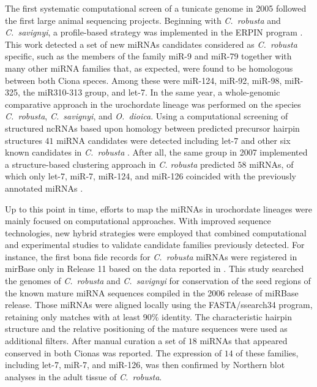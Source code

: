 \documentclass[graybox]{svmult}
\begin{document}
The first systematic computational screen of a tunicate genome in 2005
followed the first large animal sequencing projects. Beginning with
\textit{C.\ robusta} and \textit{C.\ savignyi}, a profile-based strategy
was implemented in the ERPIN program \cite{Legendre2005}. This work
detected a set of new miRNAs candidates considered as \textit{C.\ robusta}
specific, such as the members of the family miR-9 and miR-79 together with
many other miRNA families that, as expected, were found to be homologous between
both Ciona speces. Among these were miR-124, miR-92, miR-98, miR-325, 
the miR310-313 group, and let-7. In the same year, a whole-genomic comparative
approach in the urochordate lineage was performed on the species
\textit{C.\ robusta}, \textit{C.\ savignyi}, and \textit{O.\ dioica}. Using a
computational screening of structured ncRNAs based upon homology between
predicted precursor hairpin structures $41$ miRNA candidates were detected
including let-7 and other six known candidates in \textit{C.\ robusta}
\cite{Missal2005}. After all, the same group in 2007 implemented a
structure-based clustering approach in \textit{C. robusta} predicted $58$
miRNAs, of which only let-7, miR-7, miR-124, and miR-126 coincided with the
previously annotated miRNAs \cite{Will2007}.

Up to this point in time, efforts to map the miRNAs in urochordate lineages
were mainly focused on computational approaches. With improved sequence
technologies, new hybrid strategies were employed that combined
computational and experimental studies to validate candidate families
previously detected. For instance, the first bona fide records for
\textit{C.\ robusta} miRNAs were registered in mirBase only in Release 11
based on the data reported in \cite{Norden-Krichmar2007}. This study
searched the genomes of \textit{C.\ robusta} and \textit{C.\ savignyi} for
conservation of the seed regions of the known mature miRNA sequences
compiled in the 2006 release of miRBase release. Those miRNAs were aligned
locally using the FASTA/ssearch34 program, retaining only matches with at
least 90\% identity. The characteristic hairpin structure and the relative
positioning of the mature sequences were used as additional filters. After
manual curation a set of $18$ miRNAs that appeared conserved in both Cionas
was reported. The expression of $14$ of these families, including let-7,
miR-7, and miR-126, was then confirmed by Northern blot analyses in the
adult tissue of \textit{C.\ robusta}.
\end{document}
